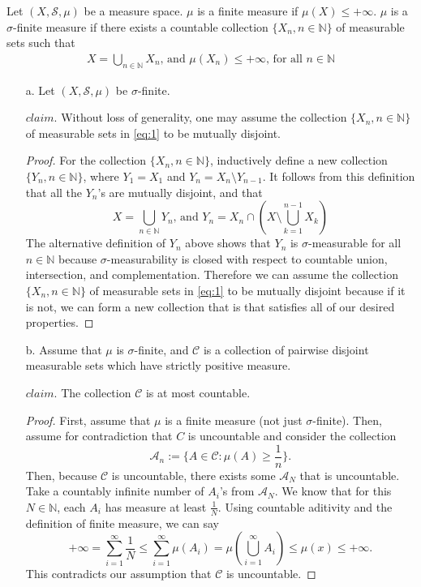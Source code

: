 \documentclass[12pt]{article}
\begin{document}
Let $(X, \mathcal{S}, \mu)$ be a measure space. $\mu$ is a finite measure if $\mu(X) \leq +\infty$. $\mu$ is a $\sigma$-finite measure if there exists a countable collection $\{ X_n, n \in \mathbb{N}\}$ of measurable sets such that \begin{align}
    X = \bigcup_{n \in \mathbb{N}} X_n \text{, and } \mu(X_n) \leq +\infty \text{, for all } n \in \mathbb{N} \label{eq:1}
\end{align}
\begin{itemize}
    \item[a.] Let $(X, \mathcal{S}, \mu)$ be $\sigma$-finite.
    
    $claim.$ Without loss of generality, one may assume the collection $\{ X_n, n \in \mathbb{N}\}$ of measurable sets in \eqref{eq:1} to be mutually disjoint.

    \begin{proof}
        For the collection $\{X_n, n \in \mathbb{N}\}$, inductively define a new collection $\{Y_n, n \in \mathbb{N}\}$, where $Y_1 = X_1$ and $Y_n = X_n \setminus Y_{n-1}$. It follows from this definition that all the $Y_n$'s are mutually disjoint, and that $$X = \bigcup_{n \in \mathbb{N}} Y_n \text{, and } Y_n = X_n \cap (X \setminus \bigcup_{k=1}^{n-1} X_k)$$ The alternative definition of $Y_n$ above shows that $Y_n$ is $\sigma$-measurable for all $n \in \mathbb{N}$ because $\sigma$-measurability is closed with respect to countable union, intersection, and complementation. Therefore we can assume the collection $\{X_n, n \in \mathbb{N}\}$ of measurable sets in \eqref{eq:1} to be mutually disjoint because if it is not, we can form a new collection that is that satisfies all of our desired properties.
    \end{proof}

    \item[b.] Assume that $\mu$ is $\sigma$-finite, and $\mathcal{C}$ is a collection of pairwise disjoint measurable sets which have strictly positive measure.
    
    $claim.$ The collection $\mathcal{C}$ is at most countable.

    \begin{proof}
        First, assume that $\mu$ is a finite measure (not just $\sigma$-finite). Then, assume for contradiction that $C$ is uncountable and consider the collection $$\mathcal{A}_n := \{A \in \mathcal{C} : \mu(A) \geq \frac{1}{n} \}.$$ Then, because $\mathcal{C}$ is uncountable, there exists some $\mathcal{A}_N$ that is uncountable. Take a countably infinite number of $A_i$'s from $\mathcal{A}_N$. We know that for this $N \in \mathbb{N}$, each $A_i$ has measure at least $\frac{1}{N}$. Using countable aditivity and the definition of finite measure, we can say $$+\infty = \sum_{i=1}^{\infty} \frac{1}{N} \leq \sum_{i=1}^{\infty} \mu(A_i) = \mu \left(\bigcup_{i=1}^\infty A_i \right) \leq \mu(x) \leq +\infty.$$ This contradicts our assumption that $\mathcal{C}$ is uncountable.


\end{proof}
\end{itemize}
\end{document}
